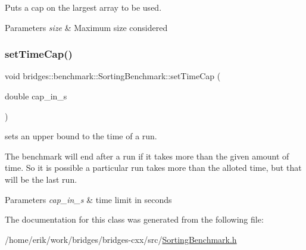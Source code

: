 Puts a cap on the largest array to be used. 


\begin{DoxyParams}{Parameters}
{\em size} & Maximum size considered \\
\hline
\end{DoxyParams}
\mbox{\label{classbridges_1_1benchmark_1_1_sorting_benchmark_a59b95f2510d62ac5a31bb33d472fdffc}} 
\subsubsection{\texorpdfstring{set\+Time\+Cap()}{setTimeCap()}}
{\footnotesize\ttfamily void bridges\+::benchmark\+::\+Sorting\+Benchmark\+::set\+Time\+Cap (\begin{DoxyParamCaption}\item[{double}]{cap\+\_\+in\+\_\+s }\end{DoxyParamCaption})\hspace{0.3cm}{\ttfamily [inline]}}



sets an upper bound to the time of a run. 

The benchmark will end after a run if it takes more than the given amount of time. So it is possible a particular run takes more than the alloted time, but that will be the last run.


\begin{DoxyParams}{Parameters}
{\em cap\+\_\+in\+\_\+s} & time limit in seconds \\
\hline
\end{DoxyParams}


The documentation for this class was generated from the following file\+:\begin{DoxyCompactItemize}
\item 
/home/erik/work/bridges/bridges-\/cxx/src/\hyperlink{_sorting_benchmark_8h}{Sorting\+Benchmark.\+h}\end{DoxyCompactItemize}
